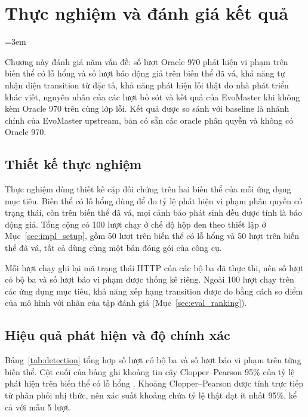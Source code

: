 \chapter{Thực nghiệm và đánh giá kết quả}
\label{chap:eval}

\begingroup
\emergencystretch=3em

Chương này đánh giá năm vấn đề: số lượt Oracle 970 phát hiện vi phạm trên biến thể có lỗ hổng và số lượt báo động giả trên biến thể đã vá, khả năng tự nhận diện transition từ đặc tả, khả năng phát hiện lỗi thật do nhà phát triển khác viết, nguyên nhân của các lượt bỏ sót và kết quả của EvoMaster khi không kèm Oracle 970 trên cùng lớp lỗi. Kết quả được so sánh với baseline là nhánh chính của EvoMaster upstream, bản có sẵn các oracle phân quyền và không có Oracle 970.

\section{Thiết kế thực nghiệm}
\label{sec:eval_design}

Thực nghiệm dùng thiết kế cặp đối chứng trên hai biến thể của mỗi ứng dụng mục tiêu. Biến thể có lỗ hổng dùng để đo tỷ lệ phát hiện vi phạm phân quyền có trạng thái, còn trên biến thể đã vá, mọi cảnh báo phát sinh đều được tính là báo động giả. Tổng cộng có 100 lượt chạy ở chế độ hộp đen theo thiết lập ở Mục~\ref{sec:impl_setup}, gồm 50 lượt trên biến thể có lỗ hổng và 50 lượt trên biến thể đã vá, tất cả dùng cùng một bản đóng gói của công cụ.

Mỗi lượt chạy ghi lại mã trạng thái HTTP của các bộ ba đã thực thi, nên số lượt có bộ ba và số lượt báo vi phạm được thống kê riêng. Ngoài 100 lượt chạy trên các ứng dụng mục tiêu, khả năng xếp hạng transition được đo bằng cách so điểm của mô hình với nhãn của tập đánh giá (Mục~\ref{sec:eval_ranking}).

\section{Hiệu quả phát hiện và độ chính xác}
\label{sec:eval_detection}

Bảng~\ref{tab:detection} tổng hợp số lượt có bộ ba và số lượt báo vi phạm trên từng biến thể. Cột cuối của bảng ghi khoảng tin cậy Clopper--Pearson 95\% của tỷ lệ phát hiện trên biến thể có lỗ hổng \cite{clopper1934use}. Khoảng Clopper--Pearson được tính trực tiếp từ phân phối nhị thức, nên xác suất khoảng chứa tỷ lệ thật đạt ít nhất 95\%, kể cả với mẫu 5 lượt.

